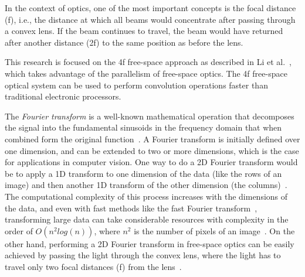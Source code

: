 \documentclass{article}
\begin{document}
In the context of optics, one of the most important concepts is the focal distance (f), i.e., the distance at which all beams would concentrate after passing through a convex lens. If the beam continues to travel, the beam would have returned after another distance (2f) to the same position as before the lens. 

This research is focused on the 4f free-space approach as described in Li et al.~\cite{li_channel_2020}, which takes advantage of the parallelism of free-space optics. The 4f free-space optical system can be used to perform convolution operations faster than traditional electronic processors.

The \textit{Fourier transform} is a well-known mathematical operation that decomposes the signal into the fundamental sinusoids in the frequency domain that when combined form the original function~\cite{bracewell_fourier_2000}. A Fourier transform is initially defined over one dimension, and can be extended to two or more dimensions, which is the case for applications in computer vision. One way to do a 2D Fourier transform would be to apply a 1D transform to one dimension of the data (like the rows of an image) and then another 1D transform of the other dimension (the columns)~\cite{gaskill_linear_1978, bracewell_fourier_2000}. The computational complexity of this process increases with the dimensions of the data, and even with fast methods like the fast Fourier transform~\cite{cooley_algorithm_1965}, transforming large data can take considerable resources with complexity in the order of $O(n^2log(n))$, where $n^2$ is the number of pixels of an image~\cite{colburn_optical_2019}. On the other hand, performing a 2D Fourier transform in free-space optics can be easily achieved by passing the light through the convex lens, where the light has to travel only two focal distances (f) from the lens~\cite{jutamulia_fourier_2002}. 
\end{document}
